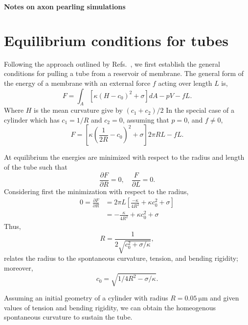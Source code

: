 \documentclass[11pt]{article}
\begin{document}
\begin{centering}
    \textbf{\Large Notes on axon pearling simulations}\\[3mm]
\end{centering}

\section{Equilibrium conditions for tubes}
Following the approach outlined by Refs.~\cite{DerenyiEtAl2002,ShurerEtAl2019}, we first establish the general conditions for pulling a tube from a reservoir of membrane.
The general form of the energy of a membrane with an external force \(f\) acting over length \(L\) is,
\begin{equation}
    F = \int_A \left[\kappa(H - c_0)^2 + \sigma \right]dA - pV - fL.
\end{equation}
Where \(H\) is the mean curvature give by \((c_1 + c_2)/2\)
In the special case of a cylinder which has \(c_1 = 1/R\) and \(c_2 = 0\), assuming that \(p=0\), and \(f\neq 0\),
\begin{equation}
    F = \left[ \kappa\left(\frac{1}{2R} - c_0\right)^2 + \sigma\right] 2\pi RL - fL.
\end{equation}

At equilibrium the energies are minimized with respect to the radius and length of the tube such that
\begin{equation}
    \frac{\partial F}{\partial R} = 0,\quad \frac{F}{\partial L} =0.
\end{equation}
Considering first the minimization with respect to the radius,
\begin{align*}
    0 = \frac{\partial F}{\partial R} & = 2\pi L\left[\frac{-\kappa}{4R^2} + \kappa c_0^2 + \sigma\right] \\
                                      & = - \frac{\kappa}{4R^2} + \kappa c_0^2 + \sigma
\end{align*}
Thus,
\begin{equation}
    R = \frac{1}{2\sqrt{c_0^2 + \sigma/\kappa}},
\end{equation}
relates the radius to the spontaneous curvature, tension, and bending rigidity; moreover,
\begin{equation}
    c_0 = \sqrt{1/4R^2 - \sigma/\kappa}.
\end{equation}

Assuming an initial geometry of a cylinder with radius \(R = \SI{0.05}{\micro\meter}\) and given values of tension and bending rigidity, we can obtain the homeogenous spontaneous curvature to sustain the tube.
\end{document}
